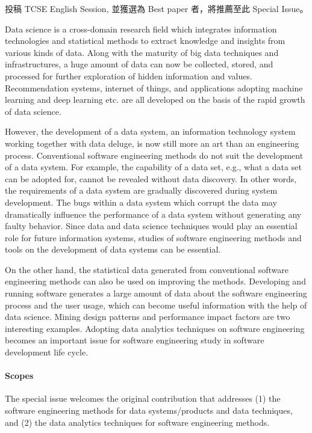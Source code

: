\documentclass[12pt,oneside,a4paper]{book}
\newcommand{\mIndent}{\hspace{.5cm}}
\begin{document}
投稿 TCSE English Session, 並獲選為 Best paper 者，將推薦至此 Special Issue。

\mIndent Data science is a cross-domain research field which integrates information technologies and statistical methods to extract knowledge and insights from various kinds of data. Along with the maturity of big data techniques and infrastructures, a huge amount of data can now be collected, stored, and processed for further exploration of hidden information and values. Recommendation systems, internet of things, and applications adopting machine learning and deep learning etc. are all developed on the basis of the rapid growth of data science. 

\mIndent However, the development of a data system, an information technology system working together with data deluge, is now still more an art than an engineering process. Conventional software engineering methods do not suit the development of a data system. For example, the capability of a data set, e.g., what a data set can be adopted for, cannot be revealed without data discovery. In other words, the requirements of a data system are gradually discovered during system development. The bugs within a data system which corrupt the data may dramatically influence the performance of a data system without generating any faulty behavior. Since data and data science techniques would play an essential role for future information systems, studies of software engineering methods and tools on the development of data systems can be essential. 

\mIndent On the other hand, the statistical data generated from conventional software engineering methods can also be used on improving the methods. Developing and running software generates a large amount of data about the software engineering process and the user usage, which can become useful information with the help of data science. Mining design patterns and performance impact factors are two interesting examples. Adopting data analytics techniques on software engineering becomes an important issue for software engineering study in software development life cycle.

\paragraph{Scopes} The special issue welcomes the original contribution that addresses (1) the software engineering methods for data systems/products and data techniques, and (2) the data analytics techniques for software engineering methods.
\end{document}

